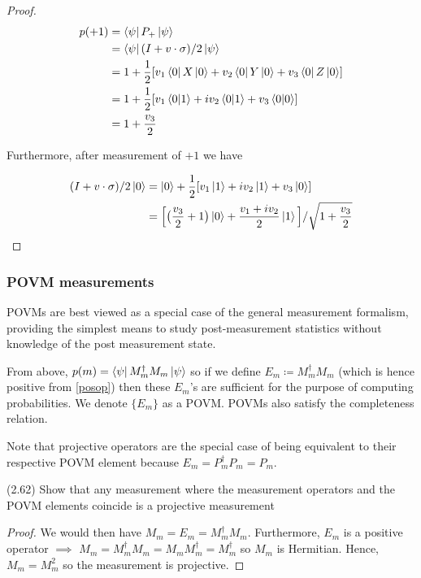 \documentclass[main.tex]{subfiles}
\begin{document}
\begin{subappendices}
\begin{exercise}
\begin{proof}
		\begin{align*}
			p(+1) &= \bra{\psi} P_+ \ket{\psi} \\
			&= \bra{\psi}(I + v \cdot \sigma)/2\ket{\psi} \\
			&= 1 + \frac{1}{2}[ v_1\bra{0} X \ket{0} + v_2\bra{0} Y \ket{0} + v_3\bra{0} Z \ket{0}] \\
			&= 1 + \frac{1}{2}[ v_1\bra{0}\ket{1} + iv_2\bra{0}\ket{1} + v_3\bra{0}\ket{0}] \\
			&= 1+ \frac{v_3}{2}
		\end{align*}
	
	Furthermore, after measurement of $+1$ we have
	
	\begin{align*}
		(I + v \cdot \sigma)/2\ket{0} &= \ket{0} + \frac{1}{2}[ v_1\ket{1} + iv_2\ket{1} + v_3\ket{0}] \\
		&= \Big[\big(\frac{v_3}{2} + 1\big)\ket{0} + \frac{v_1 + iv_2}{2}\ket{1}\Big]/\sqrt{1+ \frac{v_3}{2}}
	\end{align*}

	\end{proof}
\end{exercise}

\subsubsection{POVM measurements}\label{povm}

POVMs are best viewed as a special case of the general measurement formalism, providing the simplest means to study post-measurement statistics without knowledge of the post measurement state.

From above, $p(m) = \bra{\psi} M_m^\dagger M_m \ket{\psi}$ so if we define $E_m \coloneqq M_m^\dagger M_m$ (which is hence positive from \ref{posop}) then these $E_m$'s are sufficient for the purpose of computing probabilities. We denote $\{ E_m \}$ as a POVM. POVMs also satisfy the completeness relation.

Note that projective operators are the special case of being equivalent to their respective POVM element because $E_m = P_m^\dag P_m = P_m$. 

\begin{exercise}
(2.62) Show that any measurement where the measurement operators and the POVM elements coincide is a projective measurement

\begin{proof}
We would then have $M_m = E_m = M_m^\dag M_m$. Furthermore, $E_m$ is a positive operator $\implies$ $M_m = M_m^\dag M_m = M_m M_m^\dag = M_m^\dag$ so $M_m$ is Hermitian. Hence, $M_m = M_m^2$ so the measurement is projective.
\end{proof}	
\end{exercise}


\end{subappendices}
\end{document}
